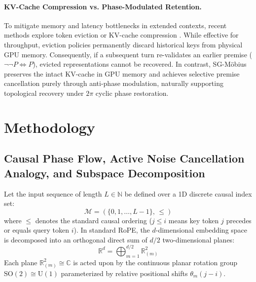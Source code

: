 \documentclass[11pt,a4paper]{article}
\theoremstyle{definition}
\begin{document}
\paragraph{KV-Cache Compression vs. Phase-Modulated Retention.}
To mitigate memory and latency bottlenecks in extended contexts, recent methods explore token eviction or KV-cache compression \cite{dao2022flashattention, xiao2023streamingllm, zhang2023h2o}. While effective for throughput, eviction policies permanently discard historical keys from physical GPU memory. Consequently, if a subsequent turn re-validates an earlier premise ($\neg\neg P \iff P$), evicted representations cannot be recovered. In contrast, SG-M\"obius preserves the intact KV-cache in GPU memory and achieves selective premise cancellation purely through anti-phase modulation, naturally supporting topological recovery under $2\pi$ cyclic phase restoration.

\section{Methodology}
\subsection{Causal Phase Flow, Active Noise Cancellation Analogy, and Subspace Decomposition}
Let the input sequence of length $L \in \mathbb{N}$ be defined over a 1D discrete causal index set:
\begin{equation}
\mathcal{M} = \left( \{0, 1, \dots, L-1\}, \, \le \right)
\end{equation}
where $\le$ denotes the standard causal ordering ($j \le i$ means key token $j$ precedes or equals query token $i$). In standard RoPE, the $d$-dimensional embedding space is decomposed into an orthogonal direct sum of $d/2$ two-dimensional planes:
\begin{equation}
\mathbb{R}^d = \bigoplus_{m=1}^{d/2} \mathbb{R}^2_{(m)}
\end{equation}
Each plane $\mathbb{R}^2_{(m)} \cong \mathbb{C}$ is acted upon by the continuous planar rotation group $\mathrm{SO}(2) \cong \mathrm{U}(1)$ parameterized by relative positional shifts $\theta_m (j - i)$.
\end{document}
